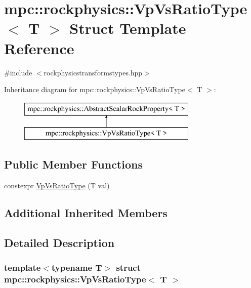 \hypertarget{structmpc_1_1rockphysics_1_1_vp_vs_ratio_type}{}\section{mpc\+:\+:rockphysics\+:\+:Vp\+Vs\+Ratio\+Type$<$ T $>$ Struct Template Reference}
\label{structmpc_1_1rockphysics_1_1_vp_vs_ratio_type}


{\ttfamily \#include $<$rockphysicstransformstypes.\+hpp$>$}

Inheritance diagram for mpc\+:\+:rockphysics\+:\+:Vp\+Vs\+Ratio\+Type$<$ T $>$\+:\begin{figure}[H]
\begin{center}
\leavevmode
\includegraphics[height=2.000000cm]{structmpc_1_1rockphysics_1_1_vp_vs_ratio_type}
\end{center}
\end{figure}
\subsection*{Public Member Functions}
\begin{DoxyCompactItemize}
\item 
constexpr \mbox{\hyperlink{structmpc_1_1rockphysics_1_1_vp_vs_ratio_type_a49f2a30e9fb2fe88647393eab21f0b9a}{Vp\+Vs\+Ratio\+Type}} (T val)
\end{DoxyCompactItemize}
\subsection*{Additional Inherited Members}


\subsection{Detailed Description}
\subsubsection*{template$<$typename T$>$\newline
struct mpc\+::rockphysics\+::\+Vp\+Vs\+Ratio\+Type$<$ T $>$}



